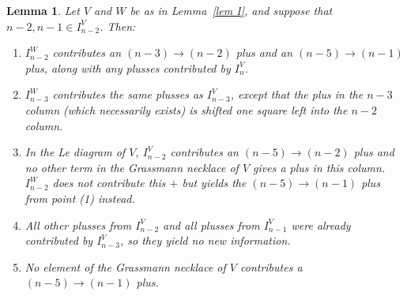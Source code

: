 \documentclass[11pt]{article}
\newtheorem{lem}[thm]{Lemma}
\theoremstyle{remark}
\theoremstyle{definition}
\begin{document}
\begin{lem}\label{lem n-2 bad}
Let $V$ and $W$ be as in Lemma~\ref{lem I}, and suppose that $n-2,n-1 \in I_{n-2}^{V}$. Then:
  \begin{enumerate}
  \item $I_{n-2}^W$ contributes an $(n-3)\rightarrow (n-2)$ plus and an $(n-5)\rightarrow (n-1)$ plus, along with any plusses contributed by $I_n^V$.
  \item $I_{n-3}^W$ contributes the same plusses as $I_{n-3}^V$, except that the plus in the $n-3$ column (which necessarily exists) is shifted one square left into the $n-2$ column.
  \item In the Le diagram of $V$, $I_{n-2}^{V}$ contributes an $(n-5)\rightarrow (n-2)$ plus and no other term in the Grassmann necklace of $V$ gives a plus in this column.  $I_{n-2}^W$ does not contribute this $+$ but yields the $(n-5)\rightarrow (n-1)$ plus from point (1) instead.
  \item All other plusses from $I_{n-2}^{V}$ and all plusses from $I_{n-1}^V$ were already contributed by $I_{n-3}^V$, so they yield no new information.
  \item No element of the Grassmann necklace of $V$ contributes a $(n-5)\rightarrow (n-1)$ plus.
  \end{enumerate} 
\end{lem}
\end{document}
